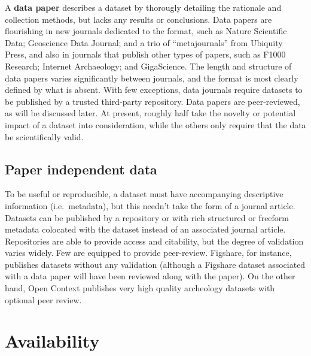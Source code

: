 \documentclass[10pt,a4paper,twocolumn]{article}
\begin{document}
A \textbf{data paper} describes a dataset by thorougly detailing the rationale and collection methods, but lacks any results or conclusions. 
Data papers are flourishing in new journals dedicated to the format, such as Nature Scientific Data\cite{nature_scientific_data}; Geoscience Data Journal\cite{geoscience_data_journal}; and a trio of ``metajournals'' from Ubiquity Press\cite{ubiquity_press_metajournals}, and also in journals that publish other types of papers, such as F1000 Research\cite{f1000_research}; Internet Archaeology\cite{internet_archaeology}; and GigaScience\cite{gigascience}. 
The length and structure of data papers varies significantly between journals, and the format is most clearly defined by what is absent.
With few exceptions, data journals require datasets to be published by a trusted third-party repository. 
Data papers are peer-reviewed, as will be discussed later.  At present, roughly half take the novelty or potential impact of a dataset into consideration, while the others only require that the data be scientifically valid.

\subsection*{Paper independent data}\label{paper-independent-data}

To be useful or reproducible, a dataset must have accompanying descriptive information (i.e.~metadata), but this needn't take the form of a journal article. 
Datasets can be published by a repository or with rich structured or freeform metadata colocated with the dataset instead of an associated journal article. Repositories are able to provide access and citability, but the degree of validation varies widely. 
Few are equipped to provide peer-review. Figshare\cite{figshare}, for instance, publishes datasets without any validation (although a Figshare dataset associated with a data paper will have been reviewed along with the paper). 
On the other hand, Open Context publishes very high quality archeology datasets with optional peer review.


\section*{Availability}\label{availability}
\end{document}
